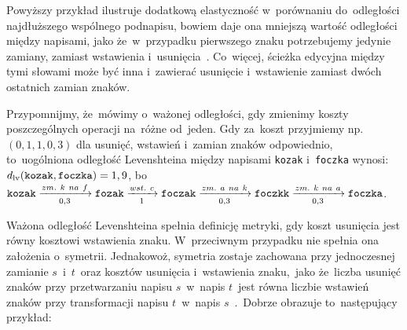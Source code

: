 \documentclass{praca1}
\begin{document}
Powyższy przykład ilustruje dodatkową elastyczność w~porównaniu do~odległości najdłuższego wspólnego podnapisu, bowiem daje ona mniejszą wartość odległości między napisami, jako że~w~przypadku pierwszego znaku potrzebujemy jedynie zamiany, zamiast wstawienia i~usunięcia~\cite{Loo2014:stringdist}. Co~więcej, ścieżka edycyjna między tymi słowami może być inna i~zawierać usunięcie i~wstawienie zamiast dwóch ostatnich zamian znaków.


Przypomnijmy, że~mówimy o~ważonej odległości, gdy zmienimy koszty poszczególnych operacji na~różne od~jeden.
Gdy za~koszt przyjmiemy np. $(0,1, 1, 0,3)$ dla usunięć, wstawień i~zamian znaków odpowiednio, to~uogólniona odległość Levenshteina między napisami \verb|kozak| i~\verb|foczka| wynosi: $d_{\mathrm{lv}}(\verb|kozak|, \verb|foczka|) = 1,9$, bo~$\verb|kozak|  \xrightarrow[0,3]{zm.\ k\ na\ f} \verb|fozak| \xrightarrow[1]{wst.\ c} \verb|foczak| \xrightarrow[0,3]{zm.\ a\ na\ k} \verb|foczkk| \xrightarrow[0,3]{zm.\ k\ na\ a} \verb|foczka|$.

Ważona odległość Levenshteina spełnia definicję metryki, gdy koszt usunięcia jest równy kosztowi wstawienia znaku. W~przeciwnym przypadku nie spełnia ona założenia o~symetrii. Jednakowoż, symetria zostaje zachowana przy jednoczesnej zamianie $s$~i~$t$~oraz kosztów usunięcia i~wstawienia znaku,~jako że~liczba usunięć znaków przy przetwarzaniu napisu $s$~w~napis $t$~jest równa liczbie wstawień znaków przy transformacji napisu $t$~w~napis $s$~\cite{Loo2014:stringdist}.~Dobrze obrazuje to~następujący przykład:
\end{document}
